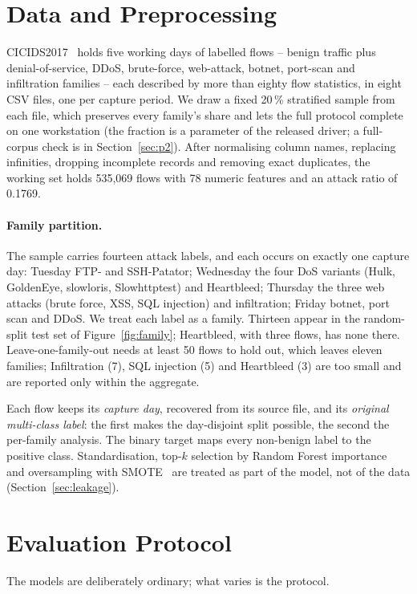 \documentclass{llncs}
\begin{document}
\section{Data and Preprocessing}
\label{sec:data}
CICIDS2017~\cite{sharafaldin2018cicids} holds five working days of labelled
flows -- benign traffic plus denial-of-service, DDoS, brute-force,
web-attack, botnet, port-scan and infiltration families -- each described by
more than eighty flow statistics, in eight CSV files, one per capture period.
We draw a fixed 20\,\% stratified sample from each file, which preserves
every family's share and lets the full protocol complete on one workstation
(the fraction is a parameter of the released driver; a full-corpus check is in
Section~\ref{sec:p2}). After normalising column names, replacing infinities,
dropping incomplete records and removing exact duplicates, the working set
holds 535{,}069 flows with 78 numeric features and an attack ratio of
0.1769.

\paragraph{Family partition.} The sample carries fourteen attack labels, and
each occurs on exactly one capture day: Tuesday FTP- and SSH-Patator;
Wednesday the four DoS variants (Hulk, GoldenEye, slowloris, Slowhttptest)
and Heartbleed; Thursday the three web attacks (brute force, XSS, SQL
injection) and infiltration; Friday botnet, port scan and DDoS. We treat each
label as a family. Thirteen appear in the random-split test set of
Figure~\ref{fig:family}; Heartbleed, with three flows, has none there.
Leave-one-family-out needs at least 50 flows to hold out, which leaves eleven
families; Infiltration (7), SQL injection (5) and Heartbleed (3) are too
small and are reported only within the aggregate.

Each flow keeps its \emph{capture day}, recovered from its source file, and
its \emph{original multi-class label}: the first makes the day-disjoint split
possible, the second the per-family analysis. The binary target maps every
non-benign label to the positive class. Standardisation, top-$k$ selection by
Random Forest importance~\cite{breiman2001random} and oversampling with
SMOTE~\cite{chawla2002smote} are treated as part of the model, not of the
data (Section~\ref{sec:leakage}).

\section{Evaluation Protocol}
\label{sec:method}
The models are deliberately ordinary; what varies is the protocol.
\end{document}
